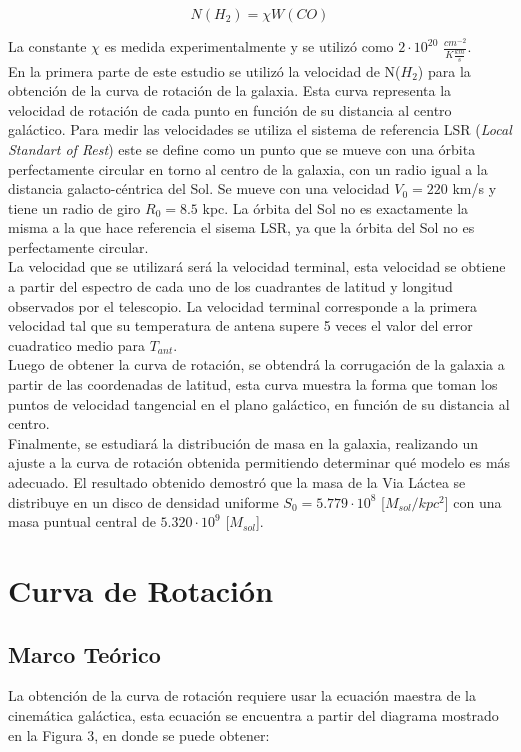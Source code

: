 \documentclass[letterpaper,oneside]{article}
\begin{document}
\begin{equation}
    N(H_2) = \chi W(CO)
\end{equation}

La constante $\chi$ es medida experimentalmente y se utilizó como $2 \cdot 10^{20}$ $\frac{cm^{-2}}{K\frac{km}{s}}$.\\

En la primera parte de este estudio se utilizó la velocidad de N($H_2$) para la obtención de la curva de rotación de la galaxia. Esta curva representa la velocidad de rotación de cada punto en función de su distancia al centro galáctico. Para medir las velocidades se utiliza el sistema de referencia LSR (\emph{Local Standart of Rest}) este se define como un punto que se mueve con una órbita perfectamente circular en torno al centro de la galaxia, con un radio igual a la distancia galacto-céntrica del Sol. Se mueve con una velocidad $V_0 = 220$ km/s y tiene un radio de giro $R_0=8.5$ kpc. La órbita del Sol no es exactamente la misma a la que hace referencia el sisema LSR, ya que la órbita del Sol no es perfectamente circular.\\

La velocidad que se utilizará será la velocidad terminal, esta velocidad se obtiene a partir del espectro de cada uno de los cuadrantes de latitud y longitud observados por el telescopio. La velocidad terminal corresponde a la primera velocidad tal que su temperatura de antena supere 5 veces el valor del error cuadratico medio para $T_{ant}$.\\

Luego de obtener la curva de rotación, se obtendrá la corrugación de la galaxia a partir de las coordenadas de latitud, esta curva muestra la forma que toman los puntos de velocidad tangencial en el plano galáctico, en función de su distancia al centro.\\

Finalmente, se estudiará la distribución de masa en la galaxia, realizando un ajuste a la curva de rotación obtenida permitiendo determinar qué modelo es más adecuado. El resultado obtenido demostró que la masa de la Via Láctea se distribuye en un disco de densidad uniforme $S_0 = 5.779 \cdot 10^{8}$ [$M_{sol}/kpc^{2}$] con una masa puntual central de  $5.320 \cdot 10^{9}$ [$M_{sol}$].

\section{Curva de Rotación}
\subsection{Marco Teórico}
La obtención de la curva de rotación requiere usar la ecuación maestra de la cinemática galáctica, esta ecuación se encuentra a partir del diagrama mostrado en la Figura 3, en donde se puede obtener:
\end{document}
